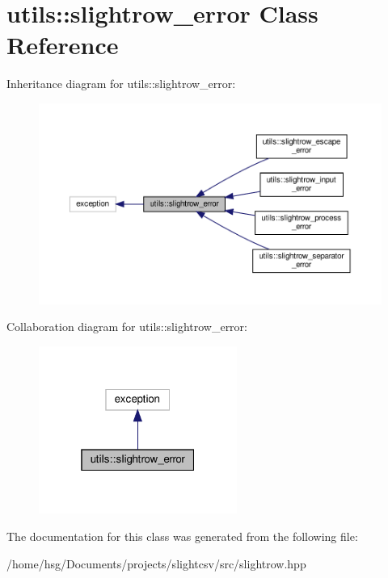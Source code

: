 \hypertarget{classutils_1_1slightrow__error}{}\section{utils\+:\+:slightrow\+\_\+error Class Reference}
\label{classutils_1_1slightrow__error}


Inheritance diagram for utils\+:\+:slightrow\+\_\+error\+:\nopagebreak
\begin{figure}[H]
\begin{center}
\leavevmode
\includegraphics[width=350pt]{classutils_1_1slightrow__error__inherit__graph}
\end{center}
\end{figure}


Collaboration diagram for utils\+:\+:slightrow\+\_\+error\+:\nopagebreak
\begin{figure}[H]
\begin{center}
\leavevmode
\includegraphics[width=184pt]{classutils_1_1slightrow__error__coll__graph}
\end{center}
\end{figure}


The documentation for this class was generated from the following file\+:\begin{DoxyCompactItemize}
\item 
/home/hsg/\+Documents/projects/slightcsv/src/slightrow.\+hpp\end{DoxyCompactItemize}
